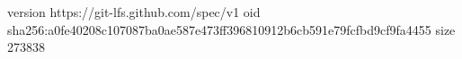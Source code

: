 version https://git-lfs.github.com/spec/v1
oid sha256:a0fe40208c107087ba0ae587e473ff396810912b6cb591e79fcfbd9cf9fa4455
size 273838
